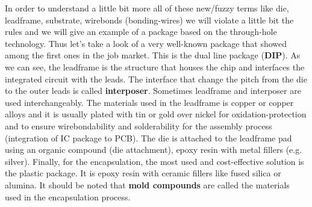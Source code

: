 \documentclass[final]{cubedoc}
\begin{document}
In order to understand a little bit more all of these new/fuzzy terms like die, leadframe, substrate, wirebonds (bonding-wires) we will violate a little bit the rules and we will give an example of a package based on the through-hole technology. Thus let's take a look of a very well-known package that showed among the first ones in the job market. This is the dual line package (\textbf{DIP}). As we can see, the leadframe is the structure that houses the chip and interfaces the integrated circuit with the leads. The interface that change the pitch from the die to the outer leads is called \textbf{interposer}. Sometimes leadframe and interposer are used interchangeably. The materials used in the leadframe is copper or copper alloys and it is usually plated with tin or gold over nickel for oxidation-protection and to ensure wirebondability and solderability for the assembly process (integration of IC package to PCB). The die is attached to the leadframe pad using an organic compound (die attachment), epoxy resin with metal fillers (e.g. silver). Finally, for the encapsulation, the most used and cost-effective solution is the plastic package. It is epoxy resin with ceramic fillers like fused silica or alumina. It should be noted that \textbf{mold compounds} are called the materials used in the encapsulation process. 

\end{document}
